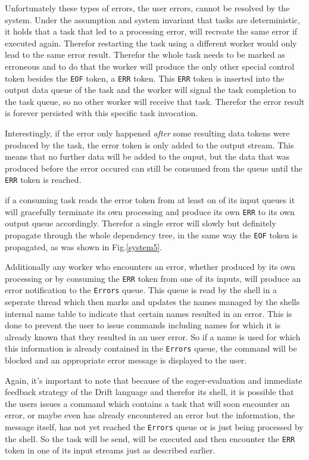 Unfortunately these types of errors, the user errors, cannot be
resolved by the system. Under the assumption and system invariant
that tasks are deterministic, it holds that a task that led to
a processing error, will recreate the same error if executed again.
Therefor restarting the task using a different worker would only
lead to the same error result. Therefor the whole task needs to
be marked as erroneous and to do that the worker will produce
the only other special control token besides the \texttt{EOF} token,
a \texttt{ERR} token. This \texttt{ERR} token is inserted into the
output data queue of the task and the worker will signal the task
completion to the task queue, so no other worker will receive
that task. Therefor the error result is forever persisted with
this specific task invocation.

Interestingly, if the error only happened \textit{after} some
resulting data tokens were produced by the task, the error token
is only added to the output stream. This means that no further data
will be added to the ouput, but the data that was produced before the
error occured can still be consumed from the queue until the
\texttt{ERR} token is reached.

if a consuming task reads the error token from at least on of
its input queues it will gracefully terminate its own processing
and produce its own \texttt{ERR} to its own output queue accordingly.
Therefor a single error will slowly but definitely propagate through
the whole dependency tree, in the same way the \texttt{EOF} token
is propagated, as was shown in Fig.\ref{system5}.

Additionally any worker who encounters an error, whether produced
by its own processing or by consuming the \texttt{ERR} token from
one of its inputs, will produce an error notification to the
\texttt{Errors} queue. This queue is read by the shell in a
seperate thread which then marks and updates the names managed by the
shells internal name table to indicate that certain names
resulted in an error. This is done to prevent the user to issue
commands including names for which it is already known that they
resulted in an user error. So if a name is used for which this
information is already contained in the \texttt{Errors} queue,
the command will be blocked and an appropriate error message is
displayed to the user.

Again, it's important to note that because of the eager-evaluation
and immediate feedback strategy of the Drift language and therefor
its shell, it is possible that the users issues a command which contains
a task that will soon encounter an error, or maybe even has already
encountered an error but the information, the message itself, has
not yet reached the \texttt{Errors} queue or is just being processed
by the shell. So the task will be send, will be executed and then
encounter the \texttt{ERR} token in one of its input streams just
as described earlier.

